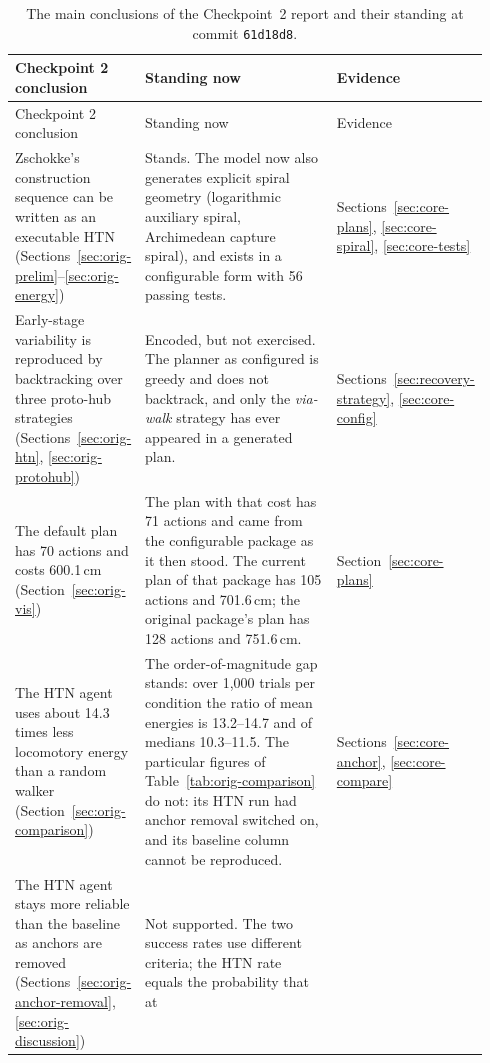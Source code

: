 \begingroup
\small
\setlength{\tabcolsep}{4pt}
\begin{longtable}{@{}p{0.27\linewidth}p{0.50\linewidth}p{0.17\linewidth}@{}}
\caption{The main conclusions of the Checkpoint~2 report and their standing at commit \texttt{61d18d8}.}
\label{tab:synthesis-revisited}\\
\toprule
Checkpoint 2 conclusion & Standing now & Evidence \\
\midrule
\endfirsthead
\toprule
Checkpoint 2 conclusion & Standing now & Evidence \\
\midrule
\endhead
Zschokke's construction sequence can be written as an executable HTN
(Sections~\ref{sec:orig-prelim}--\ref{sec:orig-energy})
& Stands. The model now also generates explicit spiral geometry (logarithmic auxiliary spiral, Archimedean
capture spiral), and exists in a configurable form with 56 passing tests.
& Sections~\ref{sec:core-plans}, \ref{sec:core-spiral}, \ref{sec:core-tests} \\
\addlinespace
Early-stage variability is reproduced by backtracking over three proto-hub strategies
(Sections~\ref{sec:orig-htn}, \ref{sec:orig-protohub})
& Encoded, but not exercised. The planner as configured is greedy and does not backtrack, and only the
\textit{via-walk} strategy has ever appeared in a generated plan.
& Sections~\ref{sec:recovery-strategy}, \ref{sec:core-config} \\
\addlinespace
The default plan has 70 actions and costs 600.1\,cm (Section~\ref{sec:orig-vis})
& The plan with that cost has 71 actions and came from the configurable package as it then stood. The current
plan of that package has 105 actions and 701.6\,cm; the original package's plan has 128 actions and
751.6\,cm.
& Section~\ref{sec:core-plans} \\
\addlinespace
The HTN agent uses about 14.3 times less locomotory energy than a random walker
(Section~\ref{sec:orig-comparison})
& The order-of-magnitude gap stands: over 1{,}000 trials per condition the ratio of mean energies is
13.2--14.7 and of medians 10.3--11.5. The particular figures of Table~\ref{tab:orig-comparison} do not: its
HTN run had anchor removal switched on, and its baseline column cannot be reproduced.
& Sections~\ref{sec:core-anchor}, \ref{sec:core-compare} \\
\addlinespace
The HTN agent stays more reliable than the baseline as anchors are removed
(Sections~\ref{sec:orig-anchor-removal}, \ref{sec:orig-discussion})
& Not supported. The two success rates use different criteria; the HTN rate equals the probability that at

\end{longtable}

